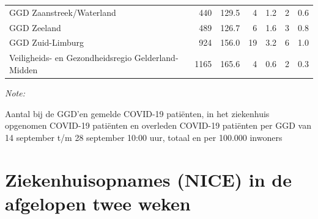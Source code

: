 \documentclass[
  english,
  man,floatsintext]{apa6}
\begin{document}
\begin{table}
\begin{threeparttable}
\begin{tabular}{lrrrrrr}
GGD Zaanstreek/Waterland & 440 & 129.5 & 4 & 1.2 & 2 & 0.6\\
GGD Zeeland & 489 & 126.7 & 6 & 1.6 & 3 & 0.8\\
GGD Zuid-Limburg & 924 & 156.0 & 19 & 3.2 & 6 & 1.0\\
Veiligheids- en Gezondheidsregio Gelderland-Midden & 1165 & 165.6 & 4 & 0.6 & 2 & 0.3\\
\bottomrule
\end{tabular}
\begin{tablenotes}
\item \textit{Note: } 
\item Aantal bij de GGD’en gemelde COVID-19 patiënten, in het ziekenhuis opgenomen COVID-19 patiënten en overleden COVID-19 patiënten per GGD van 14 september t/m 28 september 10:00 uur, totaal en per 100.000 inwoners
\end{tablenotes}
\end{threeparttable}
\endgroup{}
\end{table}

\newpage

\hypertarget{ziekenhuisopnames-nice-in-de-afgelopen-twee-weken}{%
\section{Ziekenhuisopnames (NICE) in de afgelopen twee weken}\label{ziekenhuisopnames-nice-in-de-afgelopen-twee-weken}}
\end{document}
